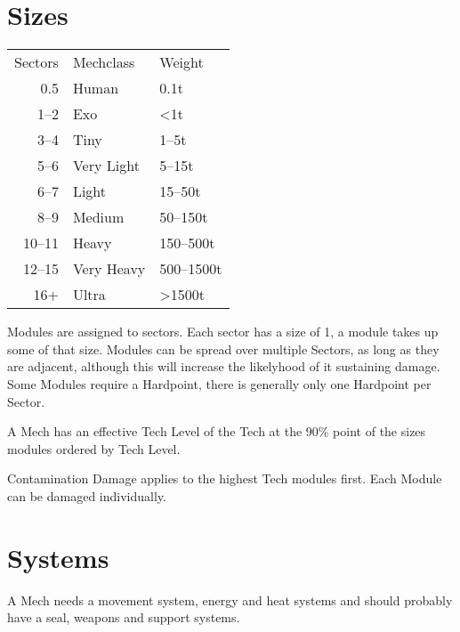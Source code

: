 \section{Sizes}\label{sec:sizes}

\begin{tabular}{r|ll}
    Sectors &Mechclass & Weight\\
    0.5 &Human & 0.1t\\
    1--2 &Exo& <1t\\
    3--4 &Tiny & 1--5t\\
    5--6 &Very Light& 5--15t\\
    6--7 &Light& 15--50t\\
    8--9 &Medium& 50--150t\\
    10--11 &Heavy& 150--500t\\
    12--15 &Very Heavy& 500--1500t\\
    16+ &Ultra& >1500t\\
\end{tabular}\par
Modules are assigned to sectors.
Each sector has a size of 1, a module takes up some of that size.
Modules can be spread over multiple Sectors, as long as they are adjacent, although this will increase the likelyhood
of it sustaining damage.
Some Modules require a Hardpoint, there is generally only one Hardpoint per Sector.\par
A Mech has an effective Tech Level of the Tech at the 90\% point of the sizes modules ordered by Tech Level.\par
Contamination Damage applies to the highest Tech modules first.
Each Module can be damaged individually.\par
\section{Systems}\label{sec:systems}
A Mech needs a movement system, energy and heat systems and should probably have a seal, weapons and support systems.
